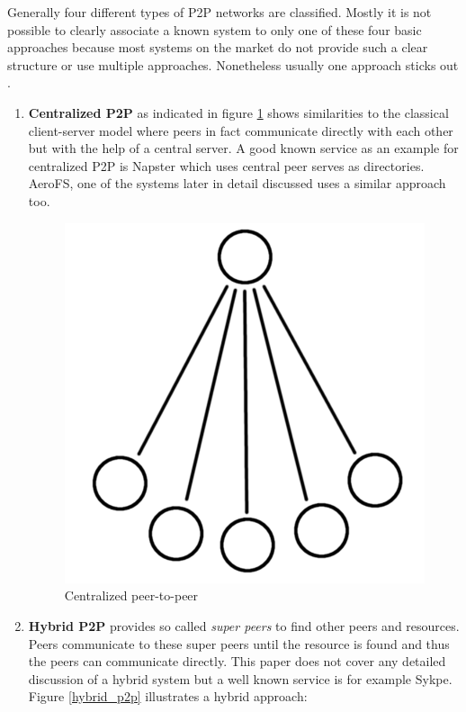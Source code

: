 Generally four different types of P2P networks are classified. Mostly it is not possible to clearly associate a known system to only one of these four basic approaches because most systems on the market do not provide such a clear structure or use multiple approaches. Nonetheless usually one approach sticks out \cite{ptp-introduction:tomptp}.
\begin{enumerate}
	\item \textbf{Centralized P2P} as indicated in figure \ref{centralized_p2p} shows similarities to the classical client-server model where peers in fact communicate directly with each other but with the help of a central server. A good known service as an example for centralized P2P is Napster which uses central peer serves as directories. AeroFS, one of the systems later in detail discussed uses a similar approach too.
	\begin{figure}[H]
		\begin{center}
		\includegraphics[scale=0.2]{Talk5/centralized_p2p.PNG}
		\end{center}
		\caption{Centralized peer-to-peer}
		\label{centralized_p2p}
	\end{figure}
	\item \textbf{Hybrid P2P} provides so called \textit{super peers} to find other peers and resources. Peers communicate to these super peers until the resource is found and thus the peers can communicate directly. This paper does not cover any detailed discussion of a hybrid system but a well known service is for example Sykpe. Figure \ref{hybrid_p2p} illustrates a hybrid approach:

\end{enumerate}
